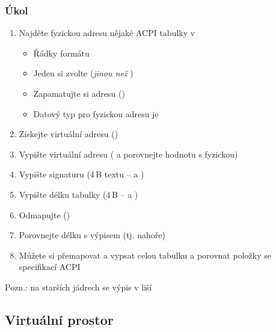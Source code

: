 \begin{frame}
  \frametitle{Úkol}
  
  \begin{enumerate}
    \item Najděte fyzickou adresu nějaké ACPI tabulky v 
    \begin{itemize}
      \item Řádky formátu 
      \item Jeden si zvolte (\emph{jinou než} )
      \item Zapamatujte si adresu ()
      \item Datový typ pro fyzickou adresu je 
    \end{itemize}

    \item Získejte virtuální adresu ()
    \item Vypište virtuální adresu ( a porovnejte hodnotu s fyzickou)
    \item Vypište signaturu (4\,B textu --  a )
    \item Vypište délku tabulky (4\,B --  a )
    \item Odmapujte ()
    \item Porovnejte délku s výpisem (tj.  nahoře)
    \item Můžete si přemapovat a vypsat celou tabulku a porovnat položky se
      specifikací ACPI
  \end{enumerate}

  \bigskip

  Pozn.: na starších jádrech se výpis v  liší

\end{frame}

\iffimuni
\subsection{Virtuální prostor}
\fi

